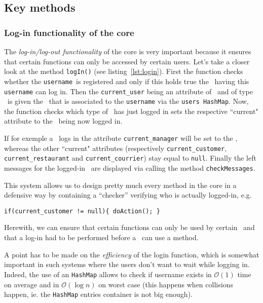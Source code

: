 \subsection{Key methods} %
\label{sub:key_methods}


\subsubsection{Log-in functionality of the core} %
\label{ssub:log_in_functionality_of_the_core}

The \emph{log-in/log-out functionality} of the core is very important because it ensures 
that certain functions can only be accessed by certain users.
Let's take a closer look at the method \lstinline|logIn()| (see listing~\ref{lst:login}).
First the function checks whether the \lstinline|username|~is
registered and only if this holds true the \User~having this \lstinline|username| can log in.
Then the \lstinline|current_user| being an attribute of \Core~and
of type \User~is given the \User~that is associated to the \lstinline|username|
via the \lstinline|users HashMap|.
Now, the function checks which type of \User~has just logged in sets 
the respective ``current" attribute to the \User~being now logged in.

If for exemple a \Manager~logs in the attribute \lstinline|current_manager| will
be set to the \User, whereas the other ``current" attributes (respectively
\lstinline|current_customer|, \lstinline|current_restaurant|
and \lstinline|current_courrier|) stay equal to \lstinline|null|.
Finally the left messages for the logged-in \User~are displayed
via calling the method \lstinline|checkMessages|.

This system allows us to design pretty much every method in the core in a defensive way 
by containing a ``checker'' verifying who is actually logged-in, e.g.
\begin{center}
  \lstinline|if(current_customer != null){ doAction(); }|
\end{center}
Herewith, we can ensure that certain functions can only be used 
by certain \User~and that a log-in had to be performed before a \User~can use a method.

A point has to be made on the \emph{efficiency} of the login function, which
is somewhat important in such systems where the users don't want to wait
while logging in.
Indeed, the use of an \lstinline|HashMap| allows to check if username exists
in $\mathcal{O}(1)$ time on average and in $\mathcal{O}(\log{n})$ on worst case
(this happens when collisions happen, ie. the \lstinline|HashMap|
entries container is not big enough)\cite{hashMap}.

